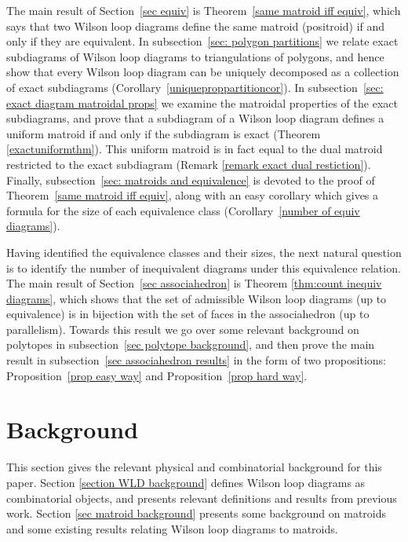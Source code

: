 \documentclass[11pt]{article}
\theoremstyle{remark}
\theoremstyle{definition}
\begin{document}
The main result of Section~\ref{sec equiv} is Theorem~\ref{same matroid iff equiv}, which says that two Wilson loop diagrams define the same matroid (positroid) if and only if they are equivalent.  In subsection~\ref{sec: polygon partitions} we relate exact subdiagrams of Wilson loop diagrams to triangulations of polygons, and hence show that every Wilson loop diagram can be uniquely decomposed as a collection of exact subdiagrams (Corollary~\ref{uniqueproppartitioncor}). In subsection~\ref{sec: exact diagram matroidal props} we examine the matroidal properties of the exact subdiagrams, and prove that a subdiagram of a Wilson loop diagram defines a uniform matroid if and only if the subdiagram is exact (Theorem \ref{exactuniformthm}). This uniform matroid is in fact equal to the dual matroid restricted to the exact subdiagram (Remark \ref{remark exact dual restiction}).  Finally, subsection~\ref{sec: matroids and equivalence} is devoted to the proof of Theorem~\ref{same matroid iff equiv}, along with an easy corollary which gives a formula for the size of each equivalence class (Corollary~\ref{number of equiv diagrams}).

Having identified the equivalence classes and their sizes, the next natural question is to identify the number of inequivalent diagrams under this equivalence relation.  The main result of Section~\ref{sec associahedron} is Theorem \ref{thm:count inequiv diagrams}, which shows that the set of admissible Wilson loop diagrams (up to equivalence) is in bijection with the set of faces in the associahedron (up to parallelism).  Towards this result we go over some relevant background on polytopes in subsection~\ref{sec polytope background}, and then prove the main result in subsection~\ref{sec associahedron results} in the form of two propositions: Proposition~\ref{prop easy way} and Proposition~\ref{prop hard way}.

\section{Background}\label{section overall background}

This section gives the relevant physical and combinatorial background for this paper. Section \ref{section WLD background} defines Wilson loop diagrams as combinatorial objects, and presents relevant definitions and results from previous work. Section \ref{sec matroid background} presents some background on matroids and some existing results relating Wilson loop diagrams to matroids. 
\end{document}
